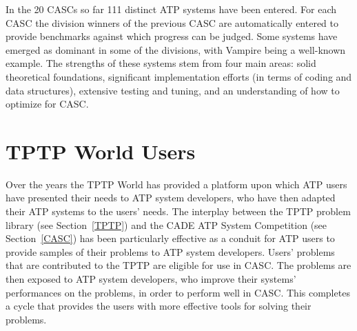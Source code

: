 \documentclass[runningheads]{llncs}
\begin{document}
In the 20 CASCs so far 111 distinct ATP systems have been entered.  
For each CASC the division winners of the previous CASC are automatically entered to provide 
benchmarks against which progress can be judged.
Some systems have emerged as dominant in some of the divisions, with Vampire being a well-known
example.
The strengths of these systems stem from four main areas:
solid theoretical foundations, significant implementation efforts (in terms of coding and data 
structures), extensive testing and tuning, and an understanding of how to optimize for CASC.

\section{TPTP World Users}
\label{Users}

Over the years the TPTP World has provided a platform upon which ATP users have presented their 
needs to ATP system developers, who have then adapted their ATP systems to the users’ needs.
The interplay between the TPTP problem library (see Section~\ref{TPTP}) and the CADE ATP
System Competition (see Section~\ref{CASC}) has been particularly effective as a conduit for 
ATP users to provide samples of their problems to ATP system developers.
Users' problems that are contributed to the TPTP are eligible for use in CASC.
The problems are then exposed to ATP system developers, who improve their systems' performances 
on the problems, in order to perform well in CASC.
This completes a cycle that provides the users with more effective tools for solving their 
problems.
\end{document}
